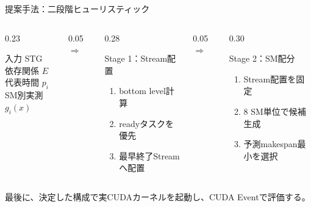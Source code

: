 \documentclass[aspectratio=169,10pt]{beamer}
\begin{document}
\begin{frame}{提案手法：二段階ヒューリスティック}
  \begin{columns}[T,onlytextwidth]
    \begin{column}{0.23\textwidth}
      \begin{block}{入力}
        \centering
        STG\\[1mm]
        依存関係 $E$\\
        代表時間 $p_i$\\
        SM別実測 $g_i(x)$
      \end{block}
    \end{column}
    \begin{column}{0.05\textwidth}
      \centering\vspace{13mm}$\Longrightarrow$
    \end{column}
    \begin{column}{0.28\textwidth}
      \begin{block}{Stage 1：Stream配置}
        \begin{enumerate}
          \item bottom level計算
          \item readyタスクを優先
          \item 最早終了Streamへ配置
        \end{enumerate}
      \end{block}
    \end{column}
    \begin{column}{0.05\textwidth}
      \centering\vspace{13mm}$\Longrightarrow$
    \end{column}
    \begin{column}{0.30\textwidth}
      \begin{block}{Stage 2：SM配分}
        \begin{enumerate}
          \item Stream配置を固定
          \item 8 SM単位で候補生成
          \item 予測makespan最小を選択
        \end{enumerate}
      \end{block}
    \end{column}
  \end{columns}
  \vspace{2mm}
  \small 最後に、決定した構成で\alert{実CUDAカーネル}を起動し、CUDA Eventで評価する。
\end{frame}
\end{document}

